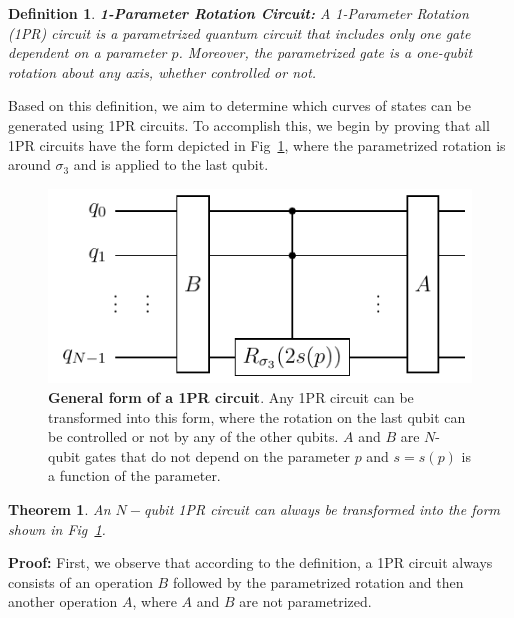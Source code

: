 \documentclass[10pt,letterpaper]{article} %
\newcommand{\fref}[1]{Fig~\ref{#1}}
\newtheorem{definition}{Definition}
\newtheorem{theorem}{Theorem}
\begin{document}
\begin{definition}{\textbf{1-Parameter Rotation Circuit:}}
A 1-Parameter Rotation (1PR) circuit is a parametrized quantum
circuit that includes only one gate dependent on a parameter $p$.
Moreover, the parametrized gate is a one-qubit rotation about any axis,
whether controlled or not.
\end{definition}

Based on this definition, we aim to determine which curves of 
states can be generated using 1PR circuits. 
To accomplish this, we begin by proving that all 1PR circuits have 
the form depicted in \fref{fig:1PR-circuit},
where the parametrized rotation is around $\sigma_3$ and
is applied to the last qubit.

\begin{figure} %
\centering
\includegraphics{images/OPR-circuit.pdf}
\caption{\textbf{General form of a 1PR circuit}.
Any 1PR circuit can be transformed into this form,
where the rotation on the last qubit
can be controlled or not by any of the other qubits.
$A$ and $B$
are $N$-qubit gates that do not depend on the parameter $p$ and
$s= s(p)$ is a function of the parameter.
}
\label{fig:1PR-circuit}
\end{figure} %

\begin{theorem}
An $N-$qubit 1PR circuit can always be transformed 
into the form shown in \fref{fig:1PR-circuit}.
\end{theorem}
\textbf{Proof:} 
First, we observe that according to the
definition, a 1PR circuit always consists of an operation $B$ followed 
by the parametrized rotation and then another operation $A$, 
where $A$ and $B$ are not parametrized.
\end{document}
